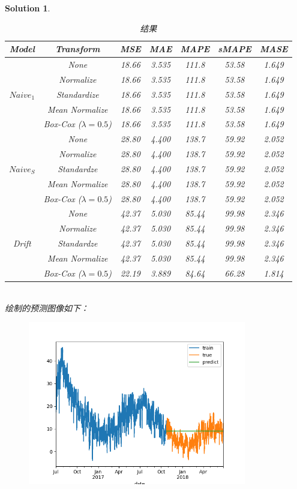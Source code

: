 \documentclass[a4paper,UTF8]{article}
\numberwithin{equation}{section}
\newtheorem*{mySol}{Solution}
\begin{document}
\begin{mySol}
\begin{table}[]
	\centering
	\caption{结果}
	\begin{tabular}{ccccccc}
		\toprule
		Model                      & Transform & MSE & MAE & MAPE & sMAPE & MASE \\
		\midrule
		\multirow{5}{*}{$Naive_1$}
		& None      & 18.66 & 3.535 & 111.8 & 53.58 & 1.649 \\
		& Normalize  & 18.66 & 3.535 & 111.8 & 53.58 & 1.649 \\
		& Standardize & 18.66 & 3.535 & 111.8 & 53.58 & 1.649  \\
		& Mean Normalize & 18.66 & 3.535 & 111.8 & 53.58 & 1.649 \\
		& Box-Cox ($\lambda=0.5$)  & 18.66 & 3.535 & 111.8 & 53.58 & 1.649 \\
		\midrule
		\multirow{5}{*}{$Naive_S$}
		& None      & 28.80 & 4.400 & 138.7 & 59.92 & 2.052 \\
		& Normalize  & 28.80 & 4.400 & 138.7 & 59.92 & 2.052 \\
		& Standardze & 28.80 & 4.400 & 138.7 & 59.92 & 2.052 \\
		& Mean Normalize & 28.80 & 4.400 & 138.7 & 59.92 & 2.052 \\
		& Box-Cox ($\lambda=0.5$) & 28.80 & 4.400 & 138.7 & 59.92 & 2.052 \\
		\midrule
		\multirow{5}{*}{Drift}
		& None      & 42.37 & 5.030 & 85.44 & 99.98 & 2.346 \\
		& Normalize  & 42.37 & 5.030 & 85.44 & 99.98 & 2.346 \\
		& Standardze & 42.37 & 5.030 & 85.44 & 99.98 & 2.346 \\
		& Mean Normalize & 42.37 & 5.030 & 85.44 & 99.98 & 2.346 \\
		& Box-Cox ($\lambda=0.5$) & 22.19 & 3.889 & 84.64 & 66.28 & 1.814 \\
		\bottomrule
	\end{tabular}
\label{tb:result}
\end{table}
~\\
绘制的预测图像如下：
\begin{figure}[htbp]
	\centering
	\includegraphics[width=0.85\textwidth]{1}

\end{figure}
\end{mySol}
\end{document}
